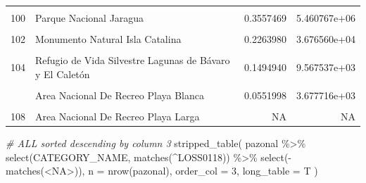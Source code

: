 \documentclass[10pt,landscape,a3paper]{article}
\newenvironment{Shaded}{\begin{snugshade}}{\end{snugshade}}
\newcommand{\AttributeTok}[1]{\textcolor[rgb]{0.77,0.63,0.00}{#1}}
\newcommand{\CommentTok}[1]{\textcolor[rgb]{0.56,0.35,0.01}{\textit{#1}}}
\newcommand{\DecValTok}[1]{\textcolor[rgb]{0.00,0.00,0.81}{#1}}
\newcommand{\FunctionTok}[1]{\textcolor[rgb]{0.00,0.00,0.00}{#1}}
\newcommand{\NormalTok}[1]{#1}
\newcommand{\SpecialCharTok}[1]{\textcolor[rgb]{0.00,0.00,0.00}{#1}}
\newcommand{\StringTok}[1]{\textcolor[rgb]{0.31,0.60,0.02}{#1}}
\begin{document}
\begin{longtable}[t]{llrr}
\cellcolor{lightgray}{99} & \cellcolor{lightgray}{Reserva Forestal Cerro de Bocanigua} & \cellcolor{lightgray}{0.3878312} & \cellcolor{lightgray}{1.132792e+05}\\
100 & Parque Nacional Jaragua & 0.3557469 & 5.460767e+06\\
\addlinespace
\cellcolor{lightgray}{101} & \cellcolor{lightgray}{Monumento Natural Los Cacheos} & \cellcolor{lightgray}{0.2519722} & \cellcolor{lightgray}{1.405244e+05}\\
102 & Monumento Natural Isla Catalina & 0.2263980 & 3.676560e+04\\
\cellcolor{lightgray}{103} & \cellcolor{lightgray}{Area Nacional De Recreo Playa de Cabo Rojo - Pedernales} & \cellcolor{lightgray}{0.1847187} & \cellcolor{lightgray}{3.235779e+04}\\
104 & Refugio de Vida Silvestre Lagunas de Bávaro y El Caletón & 0.1494940 & 9.567537e+03\\
\cellcolor{lightgray}{105} & \cellcolor{lightgray}{Area Nacional De Recreo Guaraguao - Punta Catuano} & \cellcolor{lightgray}{0.1465114} & \cellcolor{lightgray}{2.724377e+04}\\
\addlinespace
106 & Area Nacional De Recreo Playa Blanca & 0.0551998 & 3.677716e+03\\
\cellcolor{lightgray}{107} & \cellcolor{lightgray}{Area Nacional De Recreo Bahía de las Águilas} & \cellcolor{lightgray}{NA} & \cellcolor{lightgray}{NA}\\
108 & Area Nacional De Recreo Playa Larga & NA & NA\\*
\end{longtable}

\begin{Shaded}
\begin{Highlighting}[]
\CommentTok{\# ALL sorted descending by column 3}
\FunctionTok{stripped\_table}\NormalTok{(}
\NormalTok{  pazonal }\SpecialCharTok{\%\textgreater{}\%} \FunctionTok{select}\NormalTok{(CATEGORY\_NAME, }\FunctionTok{matches}\NormalTok{(}\StringTok{\textquotesingle{}\^{}LOSS0118\textquotesingle{}}\NormalTok{)) }\SpecialCharTok{\%\textgreater{}\%} \FunctionTok{select}\NormalTok{(}\SpecialCharTok{{-}}\FunctionTok{matches}\NormalTok{(}\StringTok{\textquotesingle{}\textless{}NA\textgreater{}\textquotesingle{}}\NormalTok{)),}
  \AttributeTok{n =} \FunctionTok{nrow}\NormalTok{(pazonal),}
  \AttributeTok{order\_col =} \DecValTok{3}\NormalTok{,}
  \AttributeTok{long\_table =}\NormalTok{ T}
\NormalTok{)}
\end{Highlighting}
\end{Shaded}
\end{document}
